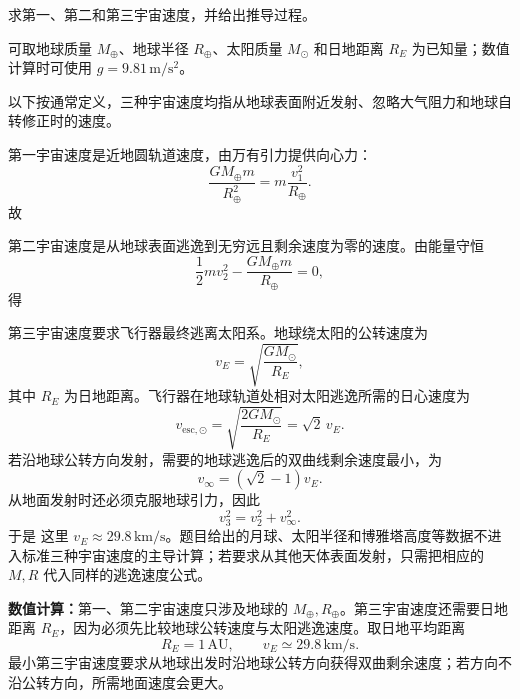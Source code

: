 \begin{question}[三种宇宙速度]
求第一、第二和第三宇宙速度，并给出推导过程。

可取地球质量 $M_\oplus$、地球半径 $R_\oplus$、太阳质量 $M_\odot$ 和日地距离 $R_E$ 为已知量；数值计算时可使用 $g=9.81\,\mathrm{m/s^2}$。

\begin{solution}
以下按通常定义，三种宇宙速度均指从地球表面附近发射、忽略大气阻力和地球自转修正时的速度。

第一宇宙速度是近地圆轨道速度，由万有引力提供向心力：
\[
  \frac{GM_\oplus m}{R_\oplus^2}=m\frac{v_1^2}{R_\oplus}.
\]
故

第二宇宙速度是从地球表面逃逸到无穷远且剩余速度为零的速度。由能量守恒
\[
  \frac12mv_2^2-\frac{GM_\oplus m}{R_\oplus}=0,
\]
得

第三宇宙速度要求飞行器最终逃离太阳系。地球绕太阳的公转速度为
\[
  v_E=\sqrt{\frac{GM_\odot}{R_E}},
\]
其中 $R_E$ 为日地距离。飞行器在地球轨道处相对太阳逃逸所需的日心速度为
\[
  v_{\mathrm{esc},\odot}=\sqrt{\frac{2GM_\odot}{R_E}}=\sqrt2\,v_E.
\]
若沿地球公转方向发射，需要的地球逃逸后的双曲线剩余速度最小，为
\[
  v_\infty=(\sqrt2-1)v_E.
\]
从地面发射时还必须克服地球引力，因此
\[
  v_3^2=v_2^2+v_\infty^2.
\]
于是
这里 $v_E\approx29.8\,\mathrm{km/s}$。题目给出的月球、太阳半径和博雅塔高度等数据不进入标准三种宇宙速度的主导计算；若要求从其他天体表面发射，只需把相应的 $M,R$ 代入同样的逃逸速度公式。


\medskip
\textbf{数值计算：}第一、第二宇宙速度只涉及地球的 $M_\oplus,R_\oplus$。第三宇宙速度还需要日地距离 $R_E$，因为必须先比较地球公转速度与太阳逃逸速度。取日地平均距离
\[
  R_E=1\,\mathrm{AU},\qquad v_E\simeq29.8\,\mathrm{km/s}.
\]
最小第三宇宙速度要求从地球出发时沿地球公转方向获得双曲剩余速度；若方向不沿公转方向，所需地面速度会更大。
\end{solution}

\end{question}

